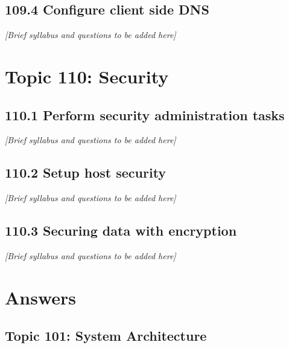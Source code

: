 \documentclass[a4paper]{report}
\begin{document}
\section{109.4 Configure client side DNS}
\textit{[Brief syllabus and questions to be added here]}

\chapter{Topic 110: Security}
\section{110.1 Perform security administration tasks}
\textit{[Brief syllabus and questions to be added here]}

\section{110.2 Setup host security}
\textit{[Brief syllabus and questions to be added here]}

\section{110.3 Securing data with encryption}
\textit{[Brief syllabus and questions to be added here]}

\clearpage

\chapter*{Answers} 

\section*{Topic 101: System Architecture}

\end{document}
